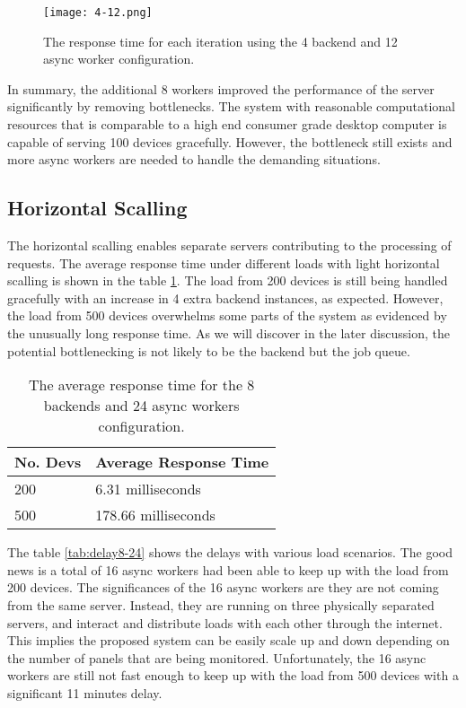 \documentclass[../thesis.tex]{subfiles}
\begin{document}
\begin{figure}[!ht]
	\centering
	\texttt{[image: 4-12.png]}
	\caption{The response time for each iteration using the 4 backend and 12 async worker configuration.}
	\label{fig:4-12}
\end{figure}

In summary, the additional 8 workers improved the performance of the server significantly by removing bottlenecks. The system with reasonable computational resources that is comparable to a high end consumer grade desktop computer is capable of serving 100 devices gracefully. However, the bottleneck still exists and more async workers are needed to handle the demanding situations. 

\subsection{Horizontal Scalling}
\label{sec:horizontal}

The horizontal scalling enables separate servers contributing to the processing of requests. The average response time under different loads with light horizontal scalling is shown in the table \ref{tab:avg8-24}. The load from 200 devices is still being handled gracefully with an increase in 4 extra backend instances, as expected. However, the load from 500 devices overwhelms some parts of the system as evidenced by the unusually long response time. As we will discover in the later discussion, the potential bottlenecking is not likely to be the backend but the job queue. 

\begin{table}[h!]
	\begin{center}
		\caption{The average response time for the 8 backends and 24 async workers configuration.}
		\label{tab:avg8-24}
		\begin{tabular}{l|l}
			\toprule
			\textbf{No. Devs} & \textbf{Average Response Time}\\
			\midrule
			200 & 6.31 milliseconds\\
			500 & 178.66 milliseconds\\
			\bottomrule
		\end{tabular}
	\end{center}
\end{table}

The table \ref{tab:delay8-24} shows the delays with various load scenarios. The good news is a total of 16 async workers had been able to keep up with the load from 200 devices. The significances of the 16 async workers are they are not coming from the same server. Instead, they are running on three physically separated servers, and interact and distribute loads with each other through the internet. This implies the proposed system can be easily scale up and down depending on the number of panels that are being monitored. Unfortunately, the 16 async workers are still not fast enough to keep up with the load from 500 devices with a significant 11 minutes delay. 
\end{document}

